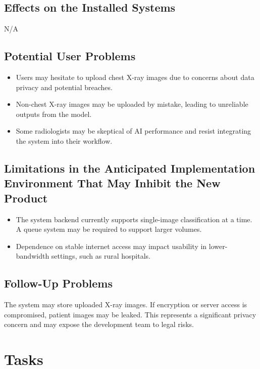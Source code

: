 \documentclass[12pt]{article}
\begin{document}
\subsection{Effects on the Installed Systems}
N/A

\subsection{Potential User Problems}
\begin{itemize}
    \item Users may hesitate to upload chest X-ray images due to concerns about data privacy and potential breaches.
    \item Non-chest X-ray images may be uploaded by mistake, leading to unreliable outputs from the model.
    \item Some radiologists may be skeptical of AI performance and resist integrating the system into their workflow.
\end{itemize}

\subsection{Limitations in the Anticipated Implementation Environment That May Inhibit the New Product}
\begin{itemize}
    \item The system backend currently supports single-image classification at a time. A queue system may be required to support larger volumes.
    \item Dependence on stable internet access may impact usability in lower-bandwidth settings, such as rural hospitals.
\end{itemize}

\subsection{Follow-Up Problems}
The system may store uploaded X-ray images. If encryption or server access is compromised, patient images may be leaked. This represents a significant privacy concern and may expose the development team to legal risks.

\section{Tasks}
\end{document}
